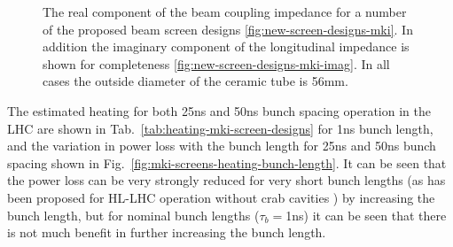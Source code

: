 \begin{figure}
\begin{center}
\end{center}
\caption{The real component of the beam coupling impedance for a number of the proposed beam screen designs \ref{fig:new-screen-designs-mki}. In addition the imaginary component of the longitudinal impedance is shown for completeness \ref{fig:new-screen-designs-mki-imag}. In all cases the outside diameter of the ceramic tube is 56mm.}
\end{figure}

The estimated heating for both 25ns and 50ns bunch spacing operation in the LHC are shown in Tab.~\ref{tab:heating-mki-screen-designs} for 1ns bunch length, and the variation in power loss with the bunch length for 25ns and 50ns bunch spacing shown in Fig.~\ref{fig:mki-screens-heating-bunch-length}. It can be seen that the power loss can be very strongly reduced for very short bunch lengths (as has been proposed for HL-LHC operation without crab cavities \cite{Bruning:beamParameters}) by increasing the bunch length, but for nominal bunch lengths ($\tau_{b}=$1ns) it can be seen that there is not much benefit in further increasing the bunch length.

